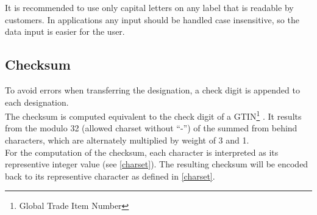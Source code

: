 It is recommended to use only capital letters on any label that is readable by
customers. In applications any input should be handled case insensitive, so the
data input is easier for the user.



\subsection{Checksum}

To avoid errors when transferring the designation, a check digit is appended to
each designation. \\

The checksum is computed equivalent to the check digit of a
GTIN\footnote{Global Trade Item Number} \cite{ean_checksum}. It results from
the modulo 32 (allowed charset without ``-'') of the summed from behind
characters, which are alternately multiplied by weight of 3 and 1. \\

For the computation of the checksum, each character is interpreted as its
representive integer value (see \ref{charset}). The resulting checksum will be
encoded back to its representive character as defined in \ref{charset}. \\


